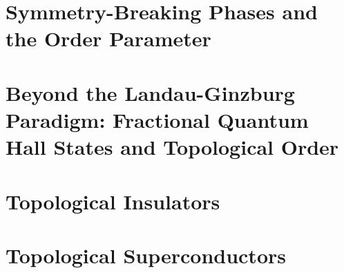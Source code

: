 \documentclass[11pt]{article}
\begin{document}
\section{Symmetry-Breaking Phases and the Order Parameter}



\section{Beyond the Landau-Ginzburg Paradigm: Fractional Quantum Hall States and Topological Order}

\section{Topological Insulators}

\section{Topological Superconductors}



\newpage
\vskip 0.5cm
\end{document}
